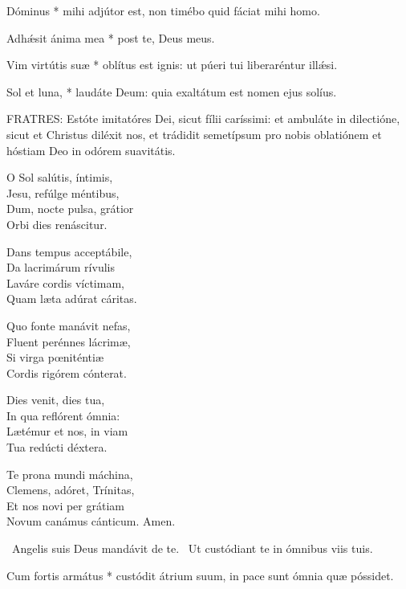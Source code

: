 
 Dóminus * mihi adjútor est, non timébo quid fáciat mihi homo.

 Adhǽsit ánima mea * post te, Deus meus.

 Vim virtútis suæ * oblítus est ignis: ut púeri tui liberaréntur illǽsi.

 Sol et luna, * laudáte Deum: quia exaltátum est nomen ejus solíus.


\lettrine[lines=2]{F}{RATRES}: Estóte imitatóres Dei, sicut fílii caríssimi: et ambuláte in dilectióne, sicut et Christus diléxit nos, et trádidit semetípsum pro nobis oblatiónem et hóstiam Deo in odórem suavitátis.


\lettrine[lines=2]{O}{} Sol salútis, íntimis,\\
Jesu, refúlge méntibus,\\
Dum, nocte pulsa, grátior\\
Orbi dies renáscitur.

Dans tempus acceptábile,\\
Da lacrimárum rívulis\\
Laváre cordis víctimam,\\
Quam læta adúrat cáritas.

Quo fonte manávit nefas,\\
Fluent perénnes lácrimæ,\\
Si virga pœniténtiæ\\
Cordis rigórem cónterat.

Dies venit, dies tua,\\
In qua reflórent ómnia:\\
Lætémur et nos, in viam\\
Tua redúcti déxtera.


Te prona mundi máchina,\\
Clemens, adóret, Trínitas,\\
Et nos novi per grátiam\\
Novum canámus cánticum. Amen.

\V\ Angelis suis Deus mandávit de te. \R\ Ut custódiant te in ómnibus viis tuis.

 Cum fortis armátus * custódit átrium suum, in pace sunt ómnia quæ póssidet.

